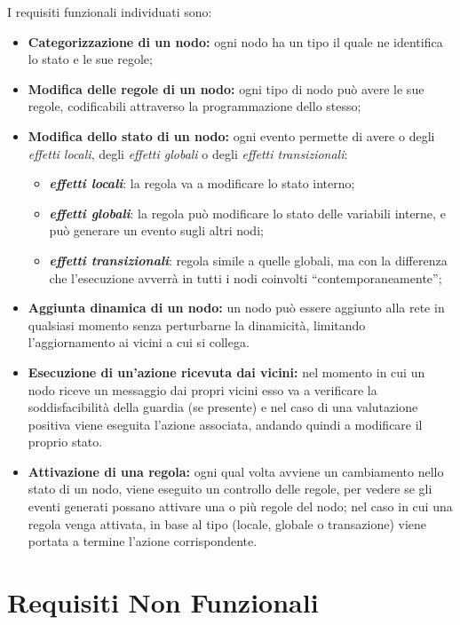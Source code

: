 \documentclass[italian]{memoir}
\begin{document}
I requisiti funzionali individuati sono:
\begin{itemize}
\item \textbf{Categorizzazione di un nodo:} ogni nodo ha un tipo il quale ne identifica
	   lo stato e le sue regole;
\item \textbf{Modifica delle regole di un nodo:} ogni tipo di nodo può avere le
	   sue regole, codificabili attraverso la programmazione dello stesso;
\item \textbf{Modifica dello stato di un nodo:} ogni evento permette di avere o degli
	   \textit{effetti locali}, degli \textit{effetti globali} o degli \textit{effetti transizionali}:
	\begin{itemize}
	\item \textit{\textbf{effetti locali}}: la regola va a modificare lo stato interno;
	\item \textit{\textbf{effetti globali}}: la regola può modificare lo stato delle
	   variabili interne, e può generare un evento sugli altri nodi;
	\item \textit{\textbf{effetti transizionali}}: regola simile a quelle globali, ma con la differenza
	   che l'esecuzione avverrà in tutti i nodi coinvolti ``contemporaneamente'';
	\end{itemize}
\item \textbf{Aggiunta dinamica di un nodo:} un nodo può essere aggiunto alla rete
	   in qualsiasi momento senza perturbarne la dinamicità, limitando l'aggiornamento
	   ai vicini a cui si collega.
\item \textbf{Esecuzione di un'azione ricevuta dai vicini:} nel momento in cui un
	   nodo riceve un messaggio dai propri vicini esso va a verificare la soddisfacibilità
	   della guardia (se presente) e nel caso di una valutazione positiva viene eseguita
	   l'azione associata, andando quindi a modificare il proprio stato.
\item \textbf{Attivazione di una regola:} ogni qual volta avviene un cambiamento
	   nello stato di un nodo, viene eseguito un controllo delle regole, per vedere
	   se gli
	   eventi generati possano attivare una o più regole del nodo; nel caso in cui
	   una regola venga attivata, in base al tipo (locale, globale o transazione) viene portata a termine
	   l'azione corrispondente.
\end{itemize}

\section{Requisiti Non Funzionali}
\end{document}
